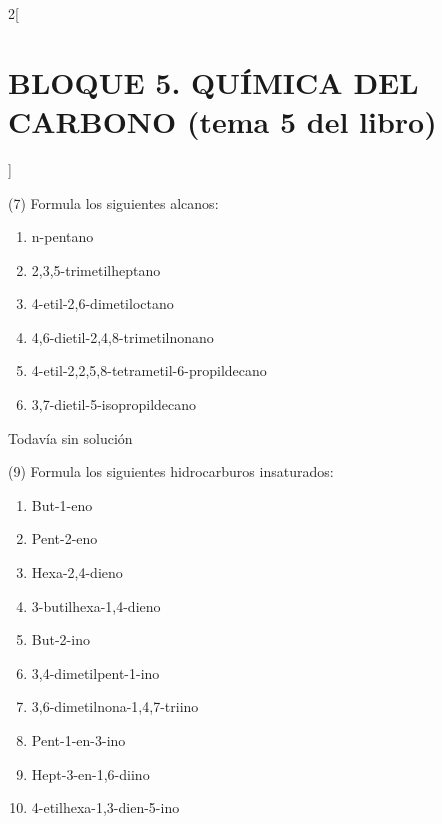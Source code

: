 \documentclass[10pt]{article}
\begin{document}
\begin{multicols}{2}[
  \section{BLOQUE 5. QUÍMICA DEL CARBONO (tema 5 del libro)}
  ]




\begin{exercise}[
    tags    = {},
    topics  = {química,química básica},
    source  = {FQ 1B MGH 2016, p85, e26},
  ]

  (7) Formula los siguientes alcanos:
  \begin{enumerate}
    \item n-pentano
    \item 2,3,5-trimetilheptano
    \item 4-etil-2,6-dimetiloctano
    \item 4,6-dietil-2,4,8-trimetilnonano
    \item 4-etil-2,2,5,8-tetrametil-6-propildecano
    \item 3,7-dietil-5-isopropildecano
  \end{enumerate}
\end{exercise}

\begin{solution}[print=false]
  Todavía sin solución
\end{solution}




\begin{exercise}[
    tags    = {},
    topics  = {química,química básica},
    source  = {FQ 1B MGH 2016, p85, e26},
  ]

  (9) Formula los siguientes hidrocarburos insaturados:
  \begin{enumerate}
    \item But-1-eno
    \item Pent-2-eno
    \item Hexa-2,4-dieno
    \item 3-butilhexa-1,4-dieno
    \item But-2-ino
    \item 3,4-dimetilpent-1-ino
    \item 3,6-dimetilnona-1,4,7-triino
    \item Pent-1-en-3-ino
    \item Hept-3-en-1,6-diino
    \item 4-etilhexa-1,3-dien-5-ino
  \end{enumerate}
\end{exercise}


\end{multicols}
\end{document}
